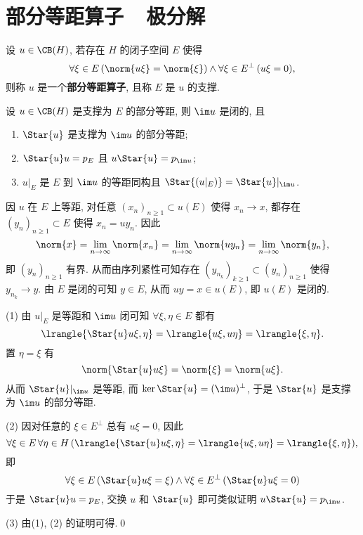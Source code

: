 	\section{部分等距算子\ \ 极分解}

	\begin{Definition}[部分等距算子]
        设 $ u\in\CB(H) $, 若存在 $ H $ 的闭子空间 $ E $ 使得
        \[
            \forall\xi\in E\,(\norm{u\xi}=\norm{\xi})\land\forall\xi\in E^\bot\,(u\xi=0),
        \]
        则称 $ u $ 是一个\textbf{部分等距算子}, 且称 $ E $ 是 $ u $ 的支撑.
    \end{Definition}

    \begin{Proposition}
        设 $ u\in\CB(H) $ 是支撑为 $ E $ 的部分等距, 则 $ \im u $ 是闭的, 且
        \begin{enumerate}[(1)]
            \item $ \Star{u} $ 是支撑为 $ \im u $ 的部分等距;
            \item $ \Star{u}u=p_E $ 且 $ u\Star{u}=p_{\im u} $;
            \item $ u|_E $ 是 $ E $ 到 $ \im u $ 的等距同构且 $ \Star{(u|_E)}=\Star{u}|_{\im u} $.
        \end{enumerate}
    \end{Proposition}
    \begin{Proof}
        因 $ u $ 在 $ E $ 上等距, 对任意 $ (x_n)_{n\geqslant 1}\subset u(E) $ 使得 $ x_n\to x $, 都存在 $ (y_n)_{n\geqslant 1}\subset E $ 使得 $ x_n=uy_n $. 因此
        \[
            \norm{x}=\lim_{n\to\infty}\norm{x_n}=\lim_{n\to\infty}\norm{uy_n}=\lim_{n\to\infty}\norm{y_n},
        \]
        即 $ (y_n)_{n\geqslant 1} $ 有界. 从而由序列紧性可知存在 $ (y_{n_k})_{k\geqslant 1}\subset(y_n)_{n\geqslant 1} $ 使得 $ y_{n_k}\to y $. 由 $ E $ 是闭的可知 $ y\in E $, 从而 $ uy=x\in u(E) $, 即 $ u(E) $ 是闭的.

        (1) 由 $ u|_E $ 是等距和 $ \im u $ 闭可知 $ \forall\xi,\eta\in E $ 都有
        \[
            \lrangle{\Star{u}u\xi,\eta}=\lrangle{u\xi,u\eta}=\lrangle{\xi,\eta}.
        \]
        置 $ \eta=\xi $ 有
        \[
            \norm{\Star{u}u\xi}=\norm{\xi}=\norm{u\xi}.
        \]
        从而 $ \Star{u}|_{\im u} $ 是等距, 而 $ \ker\Star{u}=(\im u)^\bot $, 于是 $ \Star{u} $ 是支撑为 $ \im u $ 的部分等距.

        (2) 因对任意的 $ \xi\in E^\bot $ 总有 $ u\xi=0 $, 因此
        \[
            \forall\xi\in E\,\forall\eta\in H\,(\lrangle{\Star{u}u\xi,\eta}=\lrangle{u\xi,u\eta}=\lrangle{\xi,\eta}),
        \]
        即
        \[
            \forall\xi\in E\,(\Star{u}u\xi=\xi)\land\forall\xi\in E^\bot\,(\Star{u}u\xi=0)
        \]
        于是 $ \Star{u}u=p_E $, 交换 $ u $ 和 $ \Star{u} $ 即可类似证明 $ u\Star{u}=p_{\im u} $.
        
        (3) 由(1), (2) 的证明可得.\qed
    \end{Proof}

